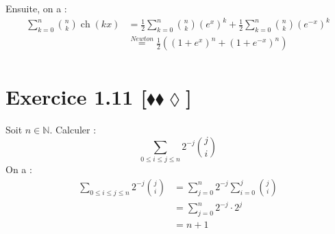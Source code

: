 \documentclass[10pt]{article}
\DeclareMathOperator{\ch}{ch}
\begin{document}
\begin{tcolorbox}[enhanced, width=7in, center, size=fbox, fontupper=\large, drop shadow southwest]
    Ensuite, on a :
    \begin{align*}
        \sum\limits^{n}_{k=0}{\binom{n}{k}\ch(kx)}&=\frac{1}{2}\sum\limits^{n}_{k=0}{\binom{n}{k}(e^x)^k+\frac{1}{2}\sum\limits^{n}_{k=0}{\binom{n}{k}{(e^{-x})^k}}}\\
        &\stackrel{Newton}{=}\frac{1}{2}\left((1+e^x)^n+(1+e^{-x})^n\right)\\
    \end{align*}
\end{tcolorbox}


\section*{Exercice 1.11 [$\blacklozenge\blacklozenge\lozenge$]}
\begin{tcolorbox}[enhanced, width=7in, center, size=fbox, fontupper=\large, drop shadow southwest]
    Soit $n\in\mathbb{N}$. Calculer :
    \begin{equation*}
        \sum\limits_{0\leq{i}\leq{j}\leq{n}}{2^{-j}\binom{j}{i}}
    \end{equation*}
    On a :
    \begin{align*}
        \sum\limits_{0\leq{i}\leq{j}\leq{n}}{2^{-j}\binom{j}{i}}
        &=\sum\limits^{n}_{j=0}{2^{-j}\sum\limits^{j}_{i=0}{\binom{j}{i}}}\\
        &=\sum\limits^{n}_{j=0}{2^{-j}\cdot2^j}\\
        &=n+1
    \end{align*}
\end{tcolorbox}
\end{document}
